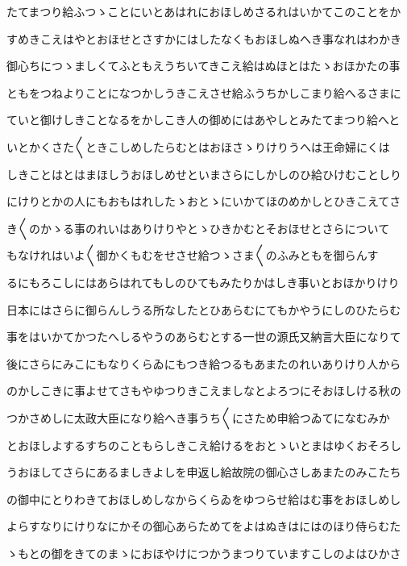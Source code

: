 \documentclass[a4paper,11pt,landscape]{ltjtarticle}
\begin{document}
\par\medskip
たてまつり給ふつゝことにいとあはれにおほしめさるれはいかてこのことをか
\par\medskip
すめきこえはやとおほせとさすかにはしたなくもおほしぬへき事なれはわかき
\par\medskip
御心ちにつゝましくてふともえうちいてきこえ給はぬほとはたゝおほかたの事
\par\medskip
ともをつねよりことになつかしうきこえさせ給ふうちかしこまり給へるさまに
\par\medskip
ていと御けしきことなるをかしこき人の御めにはあやしとみたてまつり給へと
\par\medskip
いとかくさた〱ときこしめしたらむとはおほさゝりけりうへは王命婦にくは
\par\medskip
しきことはとはまほしうおほしめせといまさらにしかしのひ給ひけむことしり
\par\medskip
にけりとかの人にもおもはれしたゝおとゝにいかてほのめかしとひきこえてさ
\par\medskip
き〱のかゝる事のれいはありけりやとゝひきかむとそおほせとさらについて
\par\medskip
もなけれはいよ〱御かくもむをせさせ給つゝさま〱のふみともを御らんす
\par\medskip
るにもろこしにはあらはれてもしのひてもみたりかはしき事いとおほかりけり
\par\medskip
日本にはさらに御らんしうる所なしたとひあらむにてもかやうにしのひたらむ
\par\medskip
事をはいかてかつたへしるやうのあらむとする一世の源氏又納言大臣になりて
\par\medskip
後にさらにみこにもなりくらゐにもつき給つるもあまたのれいありけり人から
\par\medskip
のかしこきに事よせてさもやゆつりきこえましなとよろつにそおほしける秋の
\par\medskip
つかさめしに太政大臣になり給へき事うち〱にさため申給つゐてになむみか
\par\medskip
とおほしよするすちのこともらしきこえ給けるをおとゝいとまはゆくおそろし
\par\medskip
うおほしてさらにあるましきよしを申返し給故院の御心さしあまたのみこたち
\par\medskip
の御中にとりわきておほしめしなからくらゐをゆつらせ給はむ事をおほしめし
\par\medskip
よらすなりにけりなにかその御心あらためてをよはぬきはにはのほり侍らむた
\par\medskip
ゝもとの御をきてのまゝにおほやけにつかうまつりていますこしのよはひかさ
\par\medskip
\end{document}
